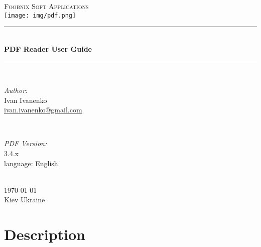 \documentclass[14pt,letter]{article}
\begin{document}
\begin{titlepage}

\newcommand{\HRule}{\rule{\linewidth}{0.5mm}} %

\center %
 

\textsc{\LARGE Foobnix Soft Applications}\\[1cm]

\texttt{[image: img/pdf.png]}\\[1cm] 

\HRule \\[0.4cm]
{ \huge \bfseries PDF Reader User Guide}\\[0.4cm] %
\HRule \\[1.5cm]
 

\begin{minipage}{0.4\textwidth}
\begin{flushleft} \large
\emph{Author:}\\
Ivan Ivanenko \\
\href{mailto:ivan.ivanenko@gmail.com}{ivan.ivanenko@gmail.com}
\end{flushleft}
\end{minipage}
~
\begin{minipage}{0.4\textwidth}
\begin{flushright} \large
\emph{PDF Version:} \\
3.4.x\\
language: English
\end{flushright}
\end{minipage}\\[5cm]


{\large \today} \\


\null
\vfill
Kiev Ukraine
\end{titlepage}


\thispagestyle{empty}

\newpage
\pagestyle{headings}
\setcounter{page}{1}

\tableofcontents

\newpage

\section{Description}
\end{document}
